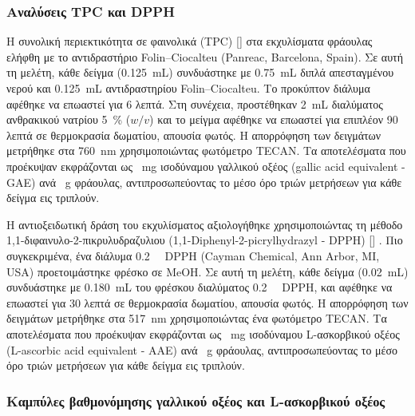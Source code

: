 \documentclass[12pt, a4paper]{report} %
\DeclareRobustCommand{\lcitep}[1]{%
  \english{[\cite{#1}]}%
}
\newcommand{\english}{\foreignlanguage{english}}
\begin{document}
\subsubsection{Αναλύσεις \english{TPC} και \english{DPPH}}\label{subsub_str_TPC_DPPH}

Η συνολική περιεκτικότητα σε φαινολικά (\english{TPC}) \lcitep{strawberries_bib18} στα εκχυλίσματα φράουλας ελήφθη με το 
αντιδραστήριο \english{Folin–Ciocalteu (Panreac, Barcelona, Spain)}. Σε αυτή τη μελέτη, κάθε δείγμα 
(\SI{0.125}{\milli\liter}) συνδυάστηκε με \SI{0.75}{\milli\liter} διπλά απεσταγμένου νερού και \SI{0.125}{\milli\liter} 
αντιδραστηρίου \english{Folin–Ciocalteu}. Το προκύπτον διάλυμα αφέθηκε να επωαστεί για 6 λεπτά. Στη συνέχεια, προστέθηκαν 
\SI{2}{\milli\liter} διαλύματος ανθρακικού νατρίου \SI{5}{\percent} \english{($w/v$)} και το μείγμα αφέθηκε να 
επωαστεί για επιπλέον 90 λεπτά σε θερμοκρασία δωματίου, απουσία φωτός. Η απορρόφηση των δειγμάτων μετρήθηκε στα 
\SI{760}{\nano\meter} χρησιμοποιώντας φωτόμετρο \english{TECAN}. Τα αποτελέσματα που προέκυψαν εκφράζονται ως 
\SI{}{\milli\gram} ισοδύναμου γαλλικού οξέος (\english{gallic acid equivalent - GAE}) ανά \SI{}{\gram} φράουλας, 
αντιπροσωπεύοντας το μέσο όρο τριών μετρήσεων για κάθε δείγμα εις τριπλούν.

Η αντιοξειδωτική δράση του εκχυλίσματος αξιολογήθηκε χρησιμοποιώντας τη μέθοδο 1,1-διφαινυλο-2-πικρυλυδραζυλιου 
(\english{1,1-Diphenyl-2-picrylhydrazyl - DPPH}) \lcitep{strawberries_bib19}. Πιο συγκεκριμένα, ένα διάλυμα 
\SI{0.2}{\milli\Molar} \english{DPPH} (\english{Cayman Chemical, Ann Arbor, MI, USA}) προετοιμάστηκε φρέσκο σε 
\english{MeOH}. Σε αυτή τη μελέτη, κάθε δείγμα (\SI{0.02}{\milli\liter}) συνδυάστηκε με \SI{0,180}{\milli\liter} του 
φρέσκου διαλύματος \SI{0.2}{\milli\Molar} \english{DPPH}, και αφέθηκε να επωαστεί για 30 λεπτά σε θερμοκρασία δωματίου, 
απουσία φωτός. Η απορρόφηση των δειγμάτων μετρήθηκε στα \SI{517}{\nano\meter} χρησιμοποιώντας ένα φωτόμετρο \english{TECAN}. 
Τα αποτελέσματα που προέκυψαν εκφράζονται ως \SI{}{\milli\gram} ισοδύναμου \english{L}-ασκορβικού οξέος 
(\english{L-ascorbic acid equivalent - AAE}) ανά \SI{}{\gram} φράουλας, αντιπροσωπεύοντας το μέσο όρο τριών μετρήσεων 
για κάθε δείγμα εις τριπλούν.

\subsubsection{Καμπύλες βαθμονόμησης γαλλικού οξέος και \english{L}-ασκορβικού οξέος}\label{subsub_str_calibration}
\end{document}
